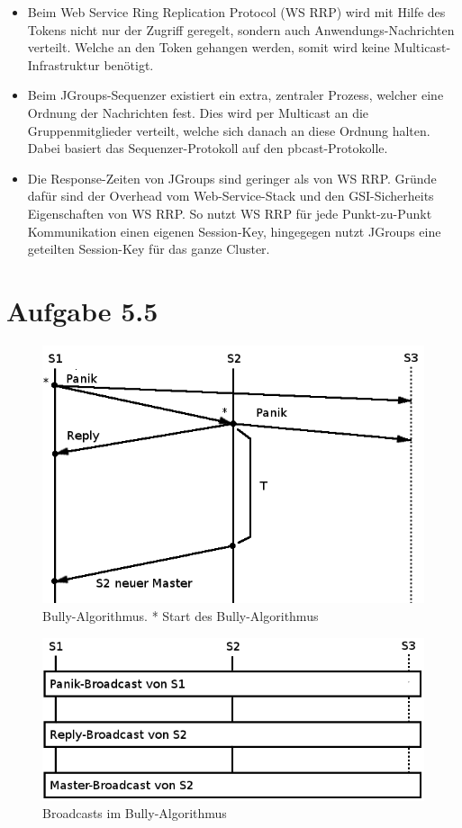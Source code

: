 \documentclass[german,12pt,a4paper]{article}
\begin{document}
\begin{itemize}

	\item Beim Web Service Ring Replication Protocol (WS RRP) wird mit Hilfe des Tokens nicht nur
		der Zugriff geregelt, sondern auch Anwendungs-Nachrichten verteilt. Welche an den Token gehangen
		werden, somit wird keine Multicast-Infrastruktur benötigt.

	\item Beim JGroups-Sequenzer existiert ein extra, zentraler Prozess, welcher eine Ordnung der
		Nachrichten fest. Dies wird per Multicast an die Gruppenmitglieder verteilt, welche sich
		danach an diese Ordnung halten. Dabei basiert das Sequenzer-Protokoll auf den
		pbcast-Protokolle.

	\item Die Response-Zeiten von JGroups sind geringer als von WS RRP. Gründe dafür sind der
		Overhead vom Web-Service-Stack und den GSI-Sicherheits Eigenschaften von WS RRP. So nutzt WS
		RRP für jede Punkt-zu-Punkt Kommunikation einen eigenen Session-Key, hingegegen nutzt
		JGroups eine geteilten Session-Key für das ganze Cluster.

\end{itemize}

\section*{Aufgabe 5.5}

\begin{figure}[h!]
  \centering
  \includegraphics[width=1\textwidth]{bully1.png}
  \caption{Bully-Algorithmus. * Start des Bully-Algorithmus}
\end{figure}

\begin{figure}[h!]
  \centering
  \includegraphics[width=1\textwidth]{bully2.png}
  \caption{Broadcasts im Bully-Algorithmus}
\end{figure}
\end{document}
